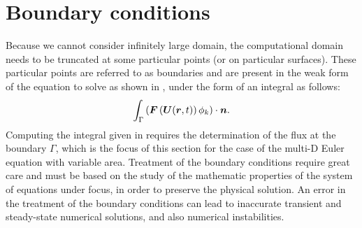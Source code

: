 \section{Boundary conditions} \label{sec:bc}
Because we cannot consider infinitely large domain, the computational domain needs to be truncated at some particular points (or on particular surfaces). These particular points are referred to as boundaries and are present in the weak form of the equation to solve as shown in , under the form of an integral as follows:
%
\begin{equation}\label{eq:hyp_weak_bc_sct3}
\int_\Gamma \left( \boldsymbol F \left( \boldsymbol U(\boldsymbol r, t) \right) \phi_k \right) \cdot \boldsymbol n.
\end{equation}
%
Computing the integral given in  requires the determination of the flux at the boundary $\Gamma$, which is the focus of this section for the case of the multi-D Euler equation with variable area. Treatment of the boundary conditions require great care and must be based on the study of the mathematic properties of the system of equations under focus, in order to preserve the physical solution. An error in the treatment of the boundary conditions can lead to inaccurate transient and steady-state numerical solutions, and also numerical instabilities.

